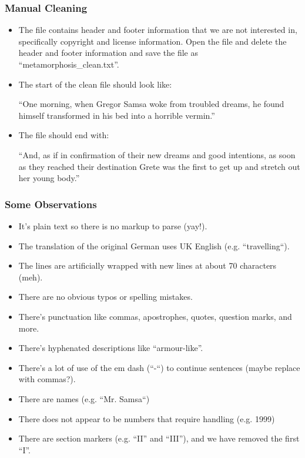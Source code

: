 \begin{frame}[fragile]\frametitle{Manual Cleaning}
\begin{itemize}
\item The file contains header and footer information that we are not interested in, specifically copyright and license information. Open the file and delete the header and footer information and save the file as ``metamorphosis\_clean.txt''.

\item The start of the clean file should look like:

``One morning, when Gregor Samsa woke from troubled dreams, he found himself transformed in his bed into a horrible vermin.''

\item The file should end with:

``And, as if in confirmation of their new dreams and good intentions, as soon as they reached their destination Grete was the first to get up and stretch out her young body.''
\end{itemize}
\end{frame}


\begin{frame}[fragile]\frametitle{Some Observations}
\begin{itemize}
\item It’s plain text so there is no markup to parse (yay!).
\item The translation of the original German uses UK English (e.g. “travelling“).
\item The lines are artificially wrapped with new lines at about 70 characters (meh).
\item There are no obvious typos or spelling mistakes.
\item There’s punctuation like commas, apostrophes, quotes, question marks, and more.
\item There’s hyphenated descriptions like “armour-like”.
\item There’s a lot of use of the em dash (“-“) to continue sentences (maybe replace with commas?).
\item There are names (e.g. “Mr. Samsa“)
\item There does not appear to be numbers that require handling (e.g. 1999)
\item There are section markers (e.g. “II” and “III”), and we have removed the first “I”.
\end{itemize}
\end{frame}

